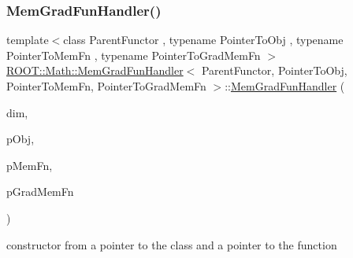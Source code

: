 \subsubsection{\texorpdfstring{MemGradFunHandler()}{MemGradFunHandler()}\hspace{0.1cm}{\footnotesize\ttfamily [2/4]}}
{\footnotesize\ttfamily template$<$class Parent\+Functor , typename Pointer\+To\+Obj , typename Pointer\+To\+Mem\+Fn , typename Pointer\+To\+Grad\+Mem\+Fn $>$ \\
\mbox{\hyperlink{classROOT_1_1Math_1_1MemGradFunHandler}{R\+O\+O\+T\+::\+Math\+::\+Mem\+Grad\+Fun\+Handler}}$<$ Parent\+Functor, Pointer\+To\+Obj, Pointer\+To\+Mem\+Fn, Pointer\+To\+Grad\+Mem\+Fn $>$\+::\mbox{\hyperlink{classROOT_1_1Math_1_1MemGradFunHandler}{Mem\+Grad\+Fun\+Handler}} (\begin{DoxyParamCaption}\item[{unsigned int}]{dim,  }\item[{const Pointer\+To\+Obj \&}]{p\+Obj,  }\item[{Pointer\+To\+Mem\+Fn}]{p\+Mem\+Fn,  }\item[{Pointer\+To\+Grad\+Mem\+Fn}]{p\+Grad\+Mem\+Fn }\end{DoxyParamCaption})\hspace{0.3cm}{\ttfamily [inline]}}



constructor from a pointer to the class and a pointer to the function 

\mbox{\label{classROOT_1_1Math_1_1MemGradFunHandler_afb840379796fb7d05d885bc3152a3175}} 
